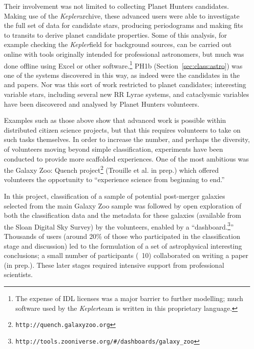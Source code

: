 \documentclass{ar2e}
\def\Sref#1{Section~\ref{#1}\xspace}
\def\CaseStudy#1{\noindent{\it\bf #1 \,\,\,\,}}
\def\url#1{\texttt{#1}}
\def\Kepler{{\it Kepler}}
\begin{document}
Their involvement was not limited to collecting Planet Hunters candidates.
Making use of the \Kepler archive, these advanced users were able to investigate
the full set of data for candidate stars, producing periodograms and making
fits  to transits to derive planet candidate properties. Some of this analysis,
for example checking the \Kepler field for  background sources, can be carried
out online with tools originally intended for professional astronomers, but much
was done offline using Excel or other software.\footnote{The expense of IDL
licenses was a major barrier to further modelling; much  software used by the
\Kepler team is written in this proprietary language.} 
PH1b (\Sref{sec:class:astro}) was one of the systems discovered in this way, as indeed 
were the candidates in the \citet{Wang2013} and \citet{Schmitt2014} papers.
Nor was this sort of work
restricted to planet candidates; interesting variable stars, including several
new RR Lyrae systems, and cataclysmic variables \citep[e.g.\ ][]{KatoOsaki} 
have been discovered and analysed by Planet Hunters volunteers. 




\CaseStudy{Galaxy Zoo: Quench.} 
Examples such as those above show that advanced work is possible within
distributed citizen science projects, but that this requires volunteers to take
on such tasks themselves. In order to increase the number, and perhaps the
diversity, of volunteers moving beyond simple classification, experiments have
been conducted to provide more scaffolded experiences. One of the most ambitious
was the Galaxy Zoo: Quench project\footnote{\url{http://quench.galaxyzoo.org}}
(Trouille et al. in prep.) which offered
volunteers the opportunity to ``experience science from beginning to end.''

In this project, classification of a sample of potential post-merger galaxies
selected from the main Galaxy Zoo sample was followed by open exploration of
both the classification data and the metadata for these galaxies (available from
the Sloan Digital Sky Survey) by the volunteers, enabled by a
``dashboard.\footnote{\url{http://tools.zooniverse.org/\#/dashboards/galaxy\_zoo}}''
Thousands of users (around 20\% of those who participated in the classification
stage and discussion) led to the formulation of a set of astrophysical
interesting conclusions; a small number of participants (~10) collaborated on
writing a paper (in prep.). These later stages required intensive support
from professional scientists.
\end{document}
